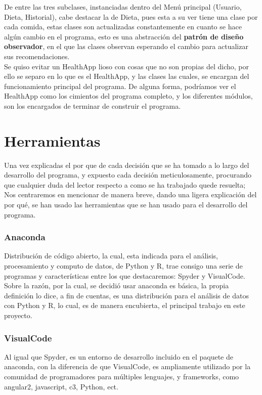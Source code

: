 De entre las tres subclases, instanciadas dentro del Menú principal (Usuario, Dieta, Historial), cabe destacar la de Dieta, pues esta a su ver tiene una clase por cada comida, estas clases son actualizadas constantemente en cuanto se hace algún cambio en el programa, esto es una abstracción del \textbf{ patrón de diseño observador}, en el que las clases observan esperando el cambio para actualizar sus recomendaciones.\\

Se quiso evitar un HealthApp lioso con cosas que no son propias del dicho, por ello se separo en lo que es el HealthApp, y las clases las cuales, se encargan del funcionamiento principal del programa. De alguna forma, podríamos ver el HealthApp como los cimientos del programa completo, y los diferentes módulos, son los encargados de terminar de construir el programa.
\section{Herramientas}
Una vez explicadas el por que de cada decisión que se ha tomado a lo largo del desarrollo del programa, y expuesto cada decisión meticulosamente, procurando que cualquier duda del lector respecto a como se ha trabajado quede resuelta; Nos centraremos en mencionar de manera breve, dando una ligera explicación del por qué, se han usado las herramientas que se han usado para el desarrollo del programa.
\subsubsection{Anaconda}
Distribución de código abierto, la cual, esta indicada para el análisis, procesamiento y computo de datos, de Python y R, trae consigo una serie de programas y características entre los que destacaremos: Spyder y VisualCode.\\

Sobre la razón, por la cual, se decidió usar anaconda es básica, la propia definición lo dice, a fin de cuentas, es una distribución para el análisis de datos con Python y R, lo cual, es de manera encubierta, el principal trabajo en este proyecto.
\subsubsection{VisualCode}
Al igual que Spyder, es un entorno de desarrollo incluido en el paquete de anaconda, con la diferencia de que VisualCode, es ampliamente utilizado por la comunidad de programadores para múltiples lenguajes, y frameworks, como angular2, javascript, c3, Python, ect.\\

